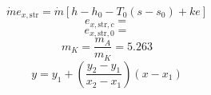 

\item[c)] 
    \[
    \dot{m} e_{x, \text{str}} = \dot{m} \left[ h - h_0 - T_0 (s - s_0) + ke \right]
    \]
    \[
    e_{x, \text{str}, c} = 
    \]
    \[
    e_{x, \text{str}, 0} = 
    \]
    \[
    m_K = \frac{m_A}{m_K} = 5.263
    \]
    \[
    y = y_1 + \left( \frac{y_2 - y_1}{x_2 - x_1} \right) (x - x_1)
    \]